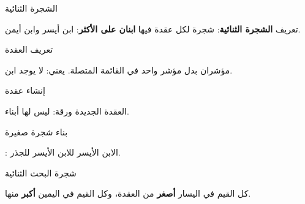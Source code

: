 \documentclass[aspectratio=169, 11pt, t, xcolor={table}]{beamer}
\begin{document}
\begin{frame}{الشجرة الثنائية}
    \begin{tbox}{\faLightbulb\quad تعريف}
        \textbf{الشجرة الثنائية}: شجرة لكل عقدة فيها \textbf{ابنان على الأكثر}: ابن أيسر وابن أيمن.
    \end{tbox}
\end{frame}

\begin{frame}{تعريف العقدة}
    \begin{center}
    \begin{minipage}{0.72\textwidth}
    \end{minipage}
    \end{center}
    \vspace{0.3cm}
    مؤشران بدل مؤشر واحد في القائمة المتصلة.  يعني: لا يوجد ابن.
\end{frame}

\begin{frame}{إنشاء عقدة}
    \begin{center}
    \begin{minipage}{0.72\textwidth}
    \end{minipage}
    \end{center}
    \vspace{0.3cm}
    العقدة الجديدة ورقة: ليس لها أبناء.
\end{frame}

\begin{frame}{بناء شجرة صغيرة}
    \begin{center}
    \begin{minipage}{0.72\textwidth}
    \end{minipage}
    \end{center}
    \vspace{0.3cm}
    : الابن الأيسر للابن الأيسر للجذر.
\end{frame}

\begin{frame}{شجرة البحث الثنائية}
    \begin{center}
    \end{center}
    كل القيم في اليسار \textbf{أصغر} من العقدة، وكل القيم في اليمين \textbf{أكبر} منها.
\end{frame}
\end{document}

